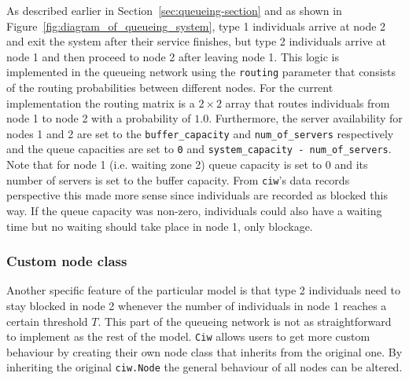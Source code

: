 As described earlier in Section~\ref{sec:queueing-section} and as shown in
Figure~\ref{fig:diagram_of_queueing_system}, type 1 individuals arrive at node 2
and exit the system after their service finishes, but type 2 individuals arrive
at node 1 and then proceed to node 2 after leaving node 1.
This logic is implemented in the queueing network using the
\lstinline[style=pystyle]{routing} parameter that consists of the routing
probabilities between different nodes.
For the current implementation the routing matrix is a \(2 \times 2\) array
that routes individuals from node 1 to node 2 with a probability of \(1.0\).
Furthermore, the server availability for nodes 1 and 2 are set to
the \lstinline[style=pystyle]{buffer_capacity} and
\lstinline[style=pystyle]{num_of_servers} respectively and the queue capacities
are set to \lstinline[style=pystyle]{0} and
\lstinline[style=pystyle]{system_capacity - num_of_servers}.
Note that for node 1 (i.e. waiting zone 2) queue capacity is set to 0 and its
number of servers is set to the buffer capacity.
From \lstinline[style=pystyle]{ciw}'s data records perspective this made more
sense since individuals are recorded as blocked this way.
If the queue capacity was non-zero, individuals could also have a waiting time
but no waiting should take place in node 1, only blockage.


\subsubsection{Custom node class}
Another specific feature of the particular model is that type 2 individuals
need to stay blocked in node 2 whenever the number of individuals in node 1
reaches a certain threshold \(T\).
This part of the queueing network is not as straightforward to implement as the
rest of the model.
\lstinline[style=pystyle]{Ciw} allows users to get more custom behaviour by
creating their own node class that inherits from the original one.
By inheriting the original \lstinline[style=pystyle]{ciw.Node} the general
behaviour of all nodes can be altered.


